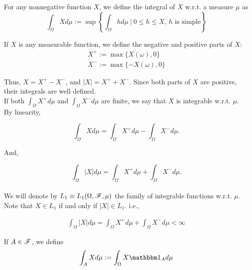 \documentclass[../TGMAFFIRO.tex]{subfiles}
\begin{document}
\begin{definition}
	For any nonnegative function $X$, we define the integral of $X$ w.r.t. a measure $\mu$ as
	\begin{equation}\label{def:lebesgue_integral}
		\int_\Omega Xd\mu := \sup\left\{\int_\Omega h d\mu \ | \ 0 \leq h \leq X \text{, $h$ is simple}\right\}
	\end{equation}
\end{definition}

If $X$ is any measurable function, we define the negative and positive parts of $X$:
\begin{align}
	X^+ := \max\{X(\omega), 0\} \\
	X^- := \max\{-X(\omega), 0\}
\end{align}

Thus, $X = X^+ - X^-$, and $|X| = X^+ + X^-$. Since both parts of $X$ are positive, their integrals are well defined.\\

If both $\int_\Omega X^+ d\mu$ and $\int_\Omega X^- d\mu$ are finite, we say that $X$ is integrable w.r.t. $\mu$. By linearity, 

\begin{equation}
	\int_\Omega X d\mu = \int_\Omega X^+ d\mu - \int_\Omega X^- d\mu.
\end{equation}

And,

\begin{equation}
	\int_\Omega |X| d\mu = \int_\Omega X^+ d\mu + \int_\Omega X^- d\mu.
\end{equation} \\

We will denote by $L_1 \equiv L_1(\Omega, \mathscr{F}, \mu)$ the family of integrable functions w.r.t. $\mu$. Note that $X \in L_1$ if and only if $|X| \in L_1$. i.e.,

\begin{align}
	\int_\Omega |X| d\mu = \int_\Omega X^+ d\mu + \int_\Omega X^- d\mu < \infty
\end{align}

If $A \in \mathscr{F}$, we define
\begin{equation}
	\int_A X d\mu := \int_\Omega X \ind_A d\mu
\end{equation}
\end{document}
